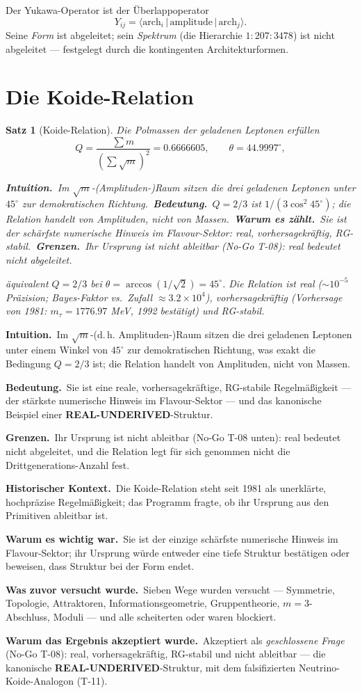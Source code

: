 \documentclass[10pt,twoside,openany]{book}
\newtheorem{theorem}{Satz}[chapter]
\newcommand{\realunder}{\textbf{REAL-UNDERIVED}}
\newcommand{\theoremnotes}[3]{%
  \par\medskip\noindent
  \textbf{Intuition.}\ #1\par
  \textbf{Bedeutung.}\ #2\par
  \textbf{Grenzen.}\ #3\par}
\newcommand{\eqnotes}[4]{%
  \par\smallskip\noindent
  \textbf{Intuition.}\ #1\ 
  \textbf{Bedeutung.}\ #2\ 
  \textbf{Warum es zählt.}\ #3\ 
  \textbf{Grenzen.}\ #4\par}
\newcommand{\historynotes}[4]{%
  \par\smallskip\noindent
  \textbf{Historischer Kontext.}\ #1\par
  \textbf{Warum es wichtig war.}\ #2\par
  \textbf{Was zuvor versucht wurde.}\ #3\par
  \textbf{Warum das Ergebnis akzeptiert wurde.}\ #4\par}
\begin{document}
Der Yukawa-Operator ist der Überlappoperator
\begin{equation}
Y_{ij} = \langle \mathrm{arch}_i \,|\,\mathrm{amplitude}\,|\,\mathrm{arch}_j\rangle .
\end{equation}
Seine \emph{Form} ist abgeleitet; sein \emph{Spektrum} (die Hierarchie $1{:}207{:}3478$)
ist nicht abgeleitet — festgelegt durch die kontingenten Architekturformen.

\section{Die Koide-Relation}

\begin{theorem}[Koide-Relation]
Die Polmassen der geladenen Leptonen erfüllen
\begin{equation}
Q = \frac{\sum m}{(\sum\sqrt{m})^2} = 0.6666605,
\qquad \theta = 44.9997^\circ,
\end{equation}

\eqnotes
{Im $\sqrt m$-(Amplituden-)Raum sitzen die drei geladenen Leptonen unter $45^\circ$ zur
demokratischen Richtung.}
{$Q=2/3$ ist $1/(3\cos^2 45^\circ)$; die Relation handelt von Amplituden, nicht von
Massen.}
{Sie ist der schärfste numerische Hinweis im Flavour-Sektor: real, vorhersagekräftig,
RG-stabil.}
{Ihr Ursprung ist nicht ableitbar (No-Go T-08): real bedeutet nicht abgeleitet.}
äquivalent $Q=2/3$ bei $\theta=\arccos(1/\sqrt2)=45^\circ$. Die Relation ist real
($\sim10^{-5}$ Präzision; Bayes-Faktor vs.\ Zufall $\approx3.2\times10^4$),
vorhersagekräftig (Vorhersage von 1981: $m_\tau=1776.97$ MeV, 1992 bestätigt) und
RG-stabil.
\end{theorem}

\theoremnotes
{Im $\sqrt m$-(d.\,h. Amplituden-)Raum sitzen die drei geladenen Leptonen unter einem
Winkel von $45^\circ$ zur demokratischen Richtung, was exakt die Bedingung $Q=2/3$ ist;
die Relation handelt von Amplituden, nicht von Massen.}
{Sie ist eine reale, vorhersagekräftige, RG-stabile Regelmäßigkeit --- der stärkste
numerische Hinweis im Flavour-Sektor --- und das kanonische Beispiel einer
\realunder-Struktur.}
{Ihr Ursprung ist nicht ableitbar (No-Go T-08 unten): real bedeutet nicht abgeleitet, und
die Relation legt für sich genommen nicht die Drittgenerations-Anzahl fest.}

\historynotes
{Die Koide-Relation steht seit 1981 als unerklärte, hochpräzise Regelmäßigkeit; das
Programm fragte, ob ihr Ursprung aus den Primitiven ableitbar ist.}
{Sie ist der einzige schärfste numerische Hinweis im Flavour-Sektor; ihr Ursprung würde
entweder eine tiefe Struktur bestätigen oder beweisen, dass Struktur bei der Form endet.}
{Sieben Wege wurden versucht --- Symmetrie, Topologie, Attraktoren, Informationsgeometrie,
Gruppentheorie, $m=3$-Abschluss, Moduli --- und alle scheiterten oder waren blockiert.}
{Akzeptiert als \emph{geschlossene Frage} (No-Go T-08): real, vorhersagekräftig,
RG-stabil und nicht ableitbar --- die kanonische \realunder-Struktur, mit dem
falsifizierten Neutrino-Koide-Analogon (T-11).}
\end{document}
